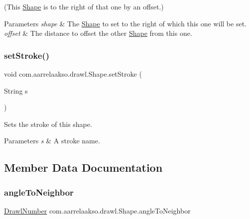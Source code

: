 (This \hyperlink{classcom_1_1aarrelaakso_1_1drawl_1_1_shape}{Shape} is to the right of that one by an offset.)


\begin{DoxyParams}{Parameters}
{\em shape} & The \hyperlink{classcom_1_1aarrelaakso_1_1drawl_1_1_shape}{Shape} to set to the right of which this one will be set. \\
\hline
{\em offset} & The distance to offset the other \hyperlink{classcom_1_1aarrelaakso_1_1drawl_1_1_shape}{Shape} from this one. \\
\hline
\end{DoxyParams}
\mbox{\label{classcom_1_1aarrelaakso_1_1drawl_1_1_shape_a3930f6fe72f6c5e0c0aa4c25ffbf18ff}} 
\subsubsection{\texorpdfstring{set\+Stroke()}{setStroke()}}
{\footnotesize\ttfamily void com.\+aarrelaakso.\+drawl.\+Shape.\+set\+Stroke (\begin{DoxyParamCaption}\item[{String}]{s }\end{DoxyParamCaption})}



Sets the stroke of this shape. 


\begin{DoxyParams}{Parameters}
{\em s} & A stroke name. \\
\hline
\end{DoxyParams}


\subsection{Member Data Documentation}
\mbox{\label{classcom_1_1aarrelaakso_1_1drawl_1_1_shape_a3825489dc33e20e34a2a4153b6f263f5}} 
\subsubsection{\texorpdfstring{angle\+To\+Neighbor}{angleToNeighbor}}
{\footnotesize\ttfamily \hyperlink{classcom_1_1aarrelaakso_1_1drawl_1_1_drawl_number}{Drawl\+Number} com.\+aarrelaakso.\+drawl.\+Shape.\+angle\+To\+Neighbor\hspace{0.3cm}{\ttfamily [private]}}



